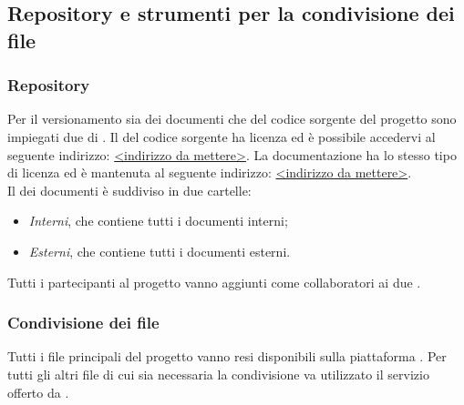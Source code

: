 \subsection{Repository e strumenti per la condivisione dei file}
\subsubsection{Repository}
Per il versionamento sia dei documenti che del codice sorgente del progetto sono impiegati due  di . Il  del codice sorgente ha licenza  ed è possibile accedervi al seguente indirizzo: \url{<indirizzo da mettere>}.
La documentazione ha lo stesso tipo di licenza ed è mantenuta al seguente indirizzo: \url{<indirizzo da mettere>}.\\
Il  dei documenti è suddiviso in due cartelle: 
\begin{itemize}
	\item \textit{Interni}, che contiene tutti i documenti interni;
	\item \textit{Esterni}, che contiene tutti i documenti esterni.
\end{itemize}
Tutti i partecipanti al progetto vanno aggiunti come collaboratori ai due .

\subsubsection{Condivisione dei file}
Tutti i file principali del progetto vanno resi disponibili sulla piattaforma . Per tutti gli altri file di cui sia necessaria la condivisione va utilizzato il servizio offerto da .

